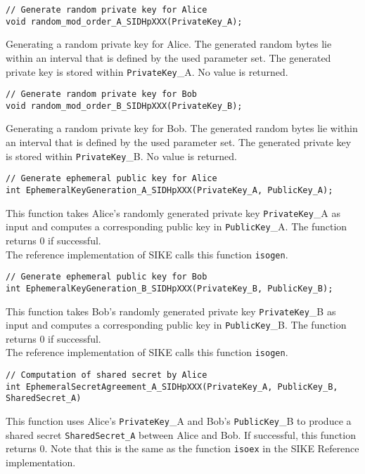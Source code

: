 \begin{lstlisting}[]
// Generate random private key for Alice
void random_mod_order_A_SIDHpXXX(PrivateKey_A);
\end{lstlisting}
Generating a random private key for Alice. The generated random bytes lie within an interval that is defined by the used parameter set. The generated private key is stored within \textcolor{keywordcol}{\texttt{PrivateKey}\_A}. No value is returned.

\begin{lstlisting}[]
// Generate random private key for Bob
void random_mod_order_B_SIDHpXXX(PrivateKey_B);
\end{lstlisting}
Generating a random private key for Bob. The generated random bytes lie within an interval that is defined by the used parameter set. The generated private key is stored within \textcolor{keywordcol}{\texttt{PrivateKey}\_B}. No value is returned.

\begin{lstlisting}[]
// Generate ephemeral public key for Alice
int EphemeralKeyGeneration_A_SIDHpXXX(PrivateKey_A, PublicKey_A);
\end{lstlisting}
This function takes Alice's randomly generated private key \textcolor{keywordcol}{\texttt{PrivateKey}\_A} as input and computes a corresponding public key in \textcolor{keywordcol}{\texttt{PublicKey}\_A}. The function returns 0 if successful.\\
The reference implementation of SIKE calls this function \texttt{isogen}.

\begin{lstlisting}[]
// Generate ephemeral public key for Bob
int EphemeralKeyGeneration_B_SIDHpXXX(PrivateKey_B, PublicKey_B);
\end{lstlisting}
This function takes Bob's randomly generated private key \textcolor{keywordcol}{\texttt{PrivateKey}\_B} as input and computes a corresponding public key in \textcolor{keywordcol}{\texttt{PublicKey}\_B}. The function returns 0 if successful.\\
The reference implementation of SIKE calls this function \texttt{isogen}.

\begin{lstlisting}[]
// Computation of shared secret by Alice
int EphemeralSecretAgreement_A_SIDHpXXX(PrivateKey_A, PublicKey_B, SharedSecret_A)
\end{lstlisting}
This function uses Alice's \textcolor{keywordcol}{\texttt{PrivateKey}\_A} and Bob's \textcolor{keywordcol}{\texttt{PublicKey}\_B} to produce a shared secret \textcolor{keywordcol}{\texttt{SharedSecret\_A}} between Alice and Bob. If successful, this function returns 0. 
Note that this is the same as the function \texttt{isoex} in the SIKE Reference implementation.

